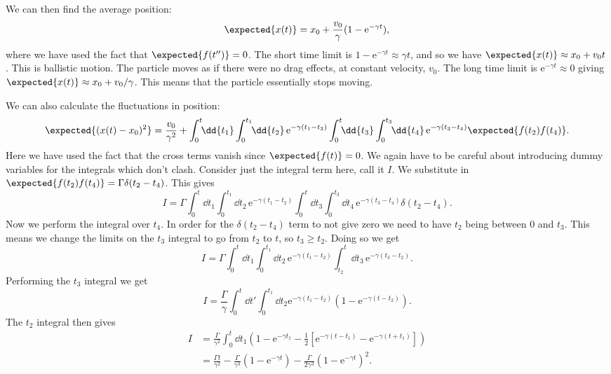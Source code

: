 \documentclass[fleqn]{NotesClass}
\newcommand*{\e}{\mathrm{e}}
\begin{document}
    We can then find the average position:
    \begin{align}
        \expected{x(t)} = x_0 + \frac{v_0}{\gamma}(1 - \e^{-\gamma t}),
    \end{align}
    where we have used the fact that \(\expected{f(t'')} = 0\).
    The short time limit is \(1 - \e^{-\gamma t} \approx \gamma t\), and so we have \(\expected{x(t)} \approx x_0 + v_0 t\).
    This is ballistic motion.
    The particle moves as if there were no drag effects, at constant velocity, \(v_0\).
    The long time limit is \(\e^{-\gamma t} \approx 0\) giving \(\expected{x(t)} \approx x_0 + v_0/\gamma\).
    This means that the particle essentially stops moving.
    
    We can also calculate the fluctuations in position:
    \begin{equation*}
        \expected{(x(t) - x_0)^2} = \frac{v_0}{\gamma^2} + \int_0^t \!\! \dd{t_1}\int_0^{t_1} \!\! \dd{t_2} \, \e^{-\gamma(t_1 - t_2)} \int_0^t \!\! \dd{t_3}\int_0^{t_3} \!\! \dd{t_4} \, \e^{-\gamma(t_3 - t_4)} \expected{f(t_2)f(t_4)}.
    \end{equation*}
    Here we have used the fact that the cross terms vanish since \(\expected{f(t)} = 0\).
    We again have to be careful about introducing dummy variables for the integrals which don't clash.
    Consider just the integral term here, call it \(I\).
    We substitute in \(\expected{f(t_2)f(t_4)} = \Gamma \delta (t_2 - t_4)\).
    This gives
    \begin{equation}
        I = \Gamma \int_0^t \!\! \dd{t_1}\int_0^{t_1} \!\! \dd{t_2} \, \e^{-\gamma(t_1 - t_2)} \int_0^t \!\! \dd{t_3}\int_0^{t_3} \!\! \dd{t_4} \, \e^{-\gamma(t_3 - t_4)} \delta(t_2 - t_4).
    \end{equation}
    Now we perform the integral over \(t_4\).
    In order for the \(\delta(t_2 - t_4)\) term to not give zero we need to have \(t_2\) being between \(0\) and \(t_3\).
    This means we change the limits on the \(t_3\) integral to go from \(t_2\) to \(t\), so \(t_3 \ge t_2\).
    Doing so we get
    \begin{equation}
        I = \Gamma \int_0^t \!\! \dd{t_1} \int_0^{t_1} \!\! \dd{t_2} \, \e^{-\gamma(t_1 - t_2)} \int_{t_2}^{t} \!\! \dd{t_3} \, \e^{-\gamma(t_3 - t_2)}.
    \end{equation}
    Performing the \(t_3\) integral we get
    \begin{equation}
        I = \frac{\Gamma}{\gamma} \int_0^t \!\! \dd{t'} \int_0^{t_1} \!\! \dd{t_2} \e^{-\gamma(t_1 - t_2)}(1 - \e^{-\gamma(t - t_2)}).
    \end{equation}
    The \(t_2\) integral then gives
    \begin{align}
        I &= \frac{\Gamma}{\gamma^2} \int_0^t \!\! \dd{t_1} \left( 1 - \e^{-\gamma t_1} - \frac{1}{2}[\e^{-\gamma(t - t_1)} - \e^{-\gamma(t + t_1)}] \right)\\
        &= \frac{\Gamma t}{\gamma^2} - \frac{\Gamma}{\gamma^3}(1 - \e^{-\gamma t}) - \frac{\Gamma}{2\gamma^3}(1 - \e^{-\gamma t})^2.
    \end{align}
    
\end{document}

